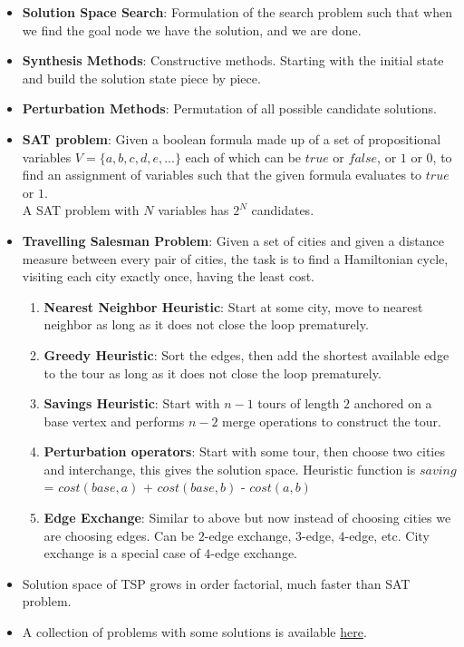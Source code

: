 \documentclass[a4paper]{article}
\begin{document}
\begin{itemize}
    \item \textbf{Solution Space Search}: Formulation of the search problem such that when we find the goal node we have the solution, and we are done.
    \item \textbf{Synthesis Methods}: Constructive methods. Starting with the initial state and build the solution state piece by piece.
    \item \textbf{Perturbation Methods}: Permutation of all possible candidate solutions.
    \item \textbf{SAT problem}: Given a boolean formula made up of a set of propositional variables $V=\{a,b,c,d,e,...\}$ each of which can be $true$ or $false$, or $1$ or $0$, to find an assignment of variables such that the given formula evaluates to $true$ or $1$.\\
    A SAT problem with $N$ variables has $2^N$ candidates.
    \item \textbf{Travelling Salesman Problem}: Given a set of cities and given a distance measure between every pair of cities, the task is to find a Hamiltonian cycle, visiting each city exactly once, having the least cost.
    \begin{enumerate}
        \item \textbf{Nearest Neighbor Heuristic}: Start at some city, move to nearest neighbor as long as it does not close the loop prematurely.
        \item \textbf{Greedy Heuristic}: Sort the edges, then add the shortest available edge to the tour as long as it does not close the loop prematurely.
        \item \textbf{Savings Heuristic}: Start with $n-1$ tours of length $2$ anchored on a base vertex and performs $n-2$ merge operations to construct the tour.
        \item \textbf{Perturbation operators}: Start with some tour, then choose two cities and interchange, this gives the solution space. Heuristic function is $saving$ = $cost(base,a)$ + $cost(base,b)$ - $cost(a,b)$
        \item \textbf{Edge Exchange}: Similar to above but now instead of choosing cities we are choosing edges. Can be $2$-edge exchange, $3$-edge, $4$-edge, etc. City exchange is a special case of $4$-edge exchange.
    \end{enumerate}
    \item Solution space of TSP grows in order factorial, much faster than SAT problem.
    \item A collection of problems with some solutions is available \href{http://comopt.ifi.uni-heidelberg.de/software/TSPLIB95/}{here}.

\end{itemize}
\end{document}
